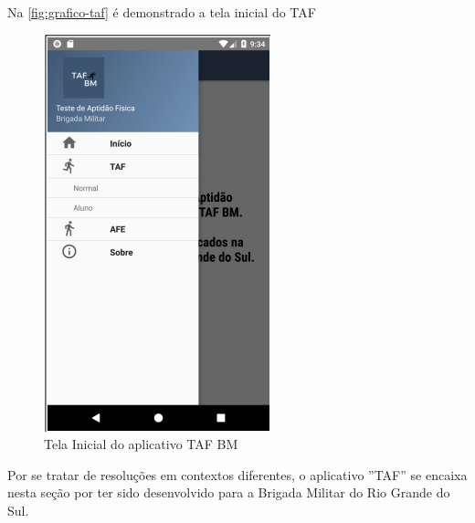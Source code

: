 Na \autoref{fig:grafico-taf} é demonstrado a tela inicial do TAF

\begin{figure}[htb]
    \caption{\label{fig:grafico-taf}Tela Inicial do aplicativo TAF BM}
    \begin{center}
        \includegraphics[scale=0.9]{imagens/taf.png}
    \end{center}
\end{figure}
Por se tratar de resoluções em contextos diferentes, o aplicativo ''TAF'' se encaixa nesta seção por ter sido desenvolvido para a Brigada Militar do Rio Grande do Sul.